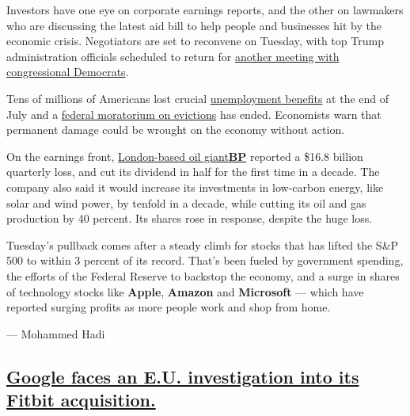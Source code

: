 Investors have one eye on corporate earnings reports, and the other on
lawmakers who are discussing the latest aid bill to help people and
businesses hit by the economic crisis. Negotiators are set to reconvene
on Tuesday, with top Trump administration officials scheduled to return
for
\href{https://www.nytimes3xbfgragh.onion/2020/08/02/us/politics/coronavirus-jobless-aid.html}{another
meeting with congressional Democrats}.

Tens of millions of Americans lost crucial
\href{https://www.nytimes3xbfgragh.onion/2020/07/30/business/unemployment-payments-change.html}{unemployment
benefits} at the end of July and a
\href{https://www.nytimes3xbfgragh.onion/2020/07/23/business/evictions-moratorium-cares-act.html}{federal
moratorium on evictions} has ended. Economists warn that permanent
damage could be wrought on the economy without action.

On the earnings front,
\href{https://www.nytimes3xbfgragh.onion/live/2020/08/04/business/stock-market-today-coronavirus/bp-to-step-up-renewable-investment-as-it-reports-a-huge-loss}{London-based
oil
giant}\textbf{\href{https://www.nytimes3xbfgragh.onion/live/2020/08/04/business/stock-market-today-coronavirus/bp-to-step-up-renewable-investment-as-it-reports-a-huge-loss}{BP}}
reported a \$16.8 billion quarterly loss, and cut its dividend in half
for the first time in a decade. The company also said it would increase
its investments in low-carbon energy, like solar and wind power, by
tenfold in a decade, while cutting its oil and gas production by 40
percent. Its shares rose in response, despite the huge loss.

Tuesday's pullback comes after a steady climb for stocks that has lifted
the S\&P 500 to within 3 percent of its record. That's been fueled by
government spending, the efforts of the Federal Reserve to backstop the
economy, and a surge in shares of technology stocks like \textbf{Apple},
\textbf{Amazon} and \textbf{Microsoft} --- which have reported surging
profits as more people work and shop from home.

--- Mohammed Hadi

\hypertarget{google-faces-an-eu-investigation-into-its-fitbit-acquisition}{%
\subsection{\texorpdfstring{\protect\hyperlink{google-faces-an-eu-investigation-into-its-fitbit-acquisition}{Google
faces an E.U. investigation into its Fitbit
acquisition.}}{Google faces an E.U. investigation into its Fitbit acquisition.}}\label{google-faces-an-eu-investigation-into-its-fitbit-acquisition}}

